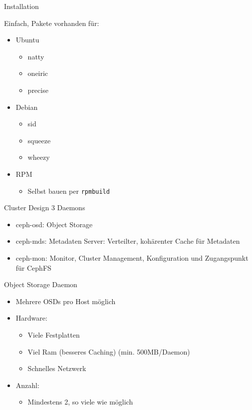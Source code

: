 \documentclass[hyperref={xetex}]{beamer}
\begin{document}
\begin{frame}{Installation}

	Einfach, Pakete vorhanden f\"ur:
	\begin{itemize}
		\item Ubuntu
		\begin{itemize}
			\item natty
			\item oneiric
			\item precise
		\end{itemize}
		\item Debian
		\begin{itemize}
			\item sid
			\item squeeze
			\item wheezy
		\end{itemize}
		\item RPM 
		\begin{itemize}
			\item Selbst bauen per \texttt{rpmbuild}
		\end{itemize}
	\end{itemize}

\end{frame}


\begin{frame}{Cluster Design}
	3 Daemons
	\begin{itemize}
		\item ceph-osd: Object Storage
		\item ceph-mds: Metadaten Server: Verteilter, koh\"arenter Cache f\"ur Metadaten %
		\item ceph-mon: Monitor, Cluster Management, Konfiguration und Zugangspunkt f\"ur CephFS
	\end{itemize}
\end{frame}


\begin{frame}{Object Storage Daemon}
	\begin{itemize}
		\item Mehrere OSDs pro Host m\"oglich
		\item Hardware:
		\begin{itemize}
			\item Viele Festplatten 
			\item Viel Ram (besseres Caching) (min. 500MB/Daemon)
			\item Schnelles Netzwerk
		\end{itemize}
		\item Anzahl:
		\begin{itemize}
			\item Mindestens 2, so viele wie m\"oglich
		\end{itemize}
	\end{itemize}
\end{frame}
\end{document}
